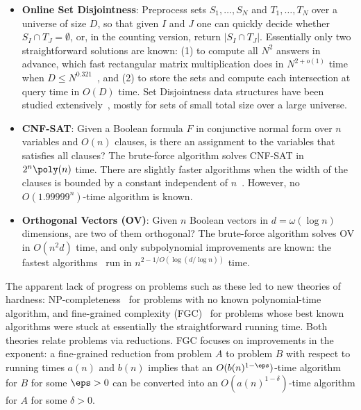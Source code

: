 \begin{itemize}
\item \textbf{Online Set Disjointness}: Preprocess sets $S_1,\dots,S_N$ and $T_1,\dots,T_N$ over a universe of size $D$, so that given $I$ and $J$ one can quickly decide whether $S_I\cap T_J=\emptyset$, or, in the counting version, return $|S_I\cap T_J|$. Essentially only two straightforward solutions are known: (1) to compute all $N^2$ answers in advance, which fast rectangular matrix multiplication does in $N^{2+o(1)}$ time when $D\le N^{0.321}$~\cite{Cop82,VXXZ24}, and (2) to store the sets and compute each intersection at query time in $O(D)$ time. Set Disjointness data structures have been studied extensively~\cite{CP10,KPP16,GKLP17b,KV20,GLP19}, mostly for sets of small total size over a large universe. 

\item \textbf{CNF-SAT}: Given a Boolean formula $F$ in conjunctive normal form over $n$ variables and $O(n)$ clauses, is there an assignment to the variables that satisfies all clauses? The brute-force algorithm solves CNF-SAT in $2^n\poly(n)$ time. There are slightly faster algorithms when the width of the clauses is bounded by a constant independent of $n$~\cite{Sch99,PPSZ05,Her14}. However, no $O(1.99999^n)$-time algorithm is known.

\item \textbf{Orthogonal Vectors (OV)}: Given $n$ Boolean vectors in $d=\omega(\log n)$ dimensions, are two of them orthogonal? The brute-force algorithm solves OV in $O(n^2d)$ time, and only subpolynomial improvements are known: the fastest algorithms~\cite{AWY15,CW21} run in $n^{2-1/O(\log(d/\log n))}$ time.
\end{itemize}






The apparent lack of progress on problems such as these led to new theories of hardness: NP-completeness~\cite{Coo71,Kar72} for problems with no known polynomial-time algorithm, and fine-grained complexity (FGC)~\cite{Vas18,Bri19} for problems whose best known algorithms were stuck at essentially the straightforward running time. Both theories relate problems via reductions. FGC focuses on improvements in the exponent: a fine-grained reduction from problem $A$ to problem $B$ with respect to running times $a(n)$ and $b(n)$ implies that an $O(b(n)^{1-\eps})$-time algorithm for $B$ for some $\eps>0$ can be converted into an $O(a(n)^{1-\delta})$-time algorithm for $A$ for some $\delta>0$. 




